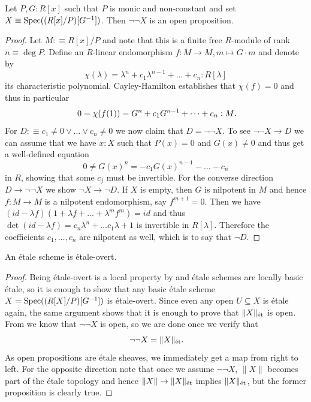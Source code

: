 \begin{lemma}
  \label{notnot-Spec(R[X]/P)_G-is-open}
  Let $P,G:R[x]$ such that $P$ is monic and non-constant and set $X \equiv \Spec ((R[x]/P)[G^{-1}])$.
  Then $\neg\neg X$ is an open proposition.
\end{lemma}

\begin{proof}
  Let $M :\equiv R[x]/P$ and note that this is a finite free $R$-module of rank $n \equiv \deg P$.
  Define an $R$-linear endomorphism $f : M \to M , m \mapsto G \cdot m$ and denote by
  \[
    \chi(\lambda) = \lambda^n + c_1\lambda^{n-1} + \dots + c_n : R[\lambda]
  \]
  its characteristic polynomial.
  Cayley-Hamilton establishes that $\chi (f) = 0$ and thus in particular
  \[
    0 = \chi (f(1)) = G^n + c_1G^{n-1} + \dots + c_n : M\rlap{.}
  \]
  For $D :\equiv c_1 \neq 0 \lor \dots \lor c_n \neq 0$ we now claim that $D = \neg\neg X$.
  To see $\neg\neg X \to D$ we can assume that we have $x:X$ such that $P(x) = 0$ and $G(x)\neq 0$ and thus get a well-defined equation
  \[
    0 \neq G(x)^n = -c_1G(x)^{n-1} - \dots - c_n
  \]
  in $R$, showing that some $c_j$ must be invertible.
  For the converse direction $D \to \neg\neg X$ we show $\neg X \to \neg D$.
  If $X$ is empty, then $G$ is nilpotent in $M$ and hence $f : M \to M$ is a nilpotent endomorphism, say $f^{m+1}=0$.
  Then we have $(id - \lambda f)(1 + \lambda f + ... + \lambda^m f^m) = id$ and thus $\det(id - \lambda f) = c_n\lambda^n + \dots c_1 \lambda + 1$ is invertible in $R[\lambda]$.
  Therefore the coefficients $c_1,\dots,c_n$ are nilpotent as well, which is to say that $\neg D$.
\end{proof}

\begin{lemma}
  An étale scheme is étale-overt.
\end{lemma}

\begin{proof}
  Being étale-overt is a local property by   and étale schemes are locally basic étale, so it is enough to show that any basic étale scheme $X = \Spec((R[X]/P)[G^{-1}])$ is étale-overt.
  Since even any open $U \subseteq X$ is étale again, the same argument shows that it is enough to prove that $\|X\|_\et$ is open.
  From  we know that $\neg\neg X$ is open, so we are done once we verify that
  \[
    \neg\neg X = \|X\|_\et\rlap{.}
  \]
  As open propositions are étale sheaves, we immediately get a map from right to left. For the opposite direction note that once we assume $\neg\neg X$, $\|X\|$ becomes part of the étale topology and hence
  $\|X\| \to \|X\|_\et$ implies $\|X\|_\et$, but the former proposition is clearly true.
\end{proof}


